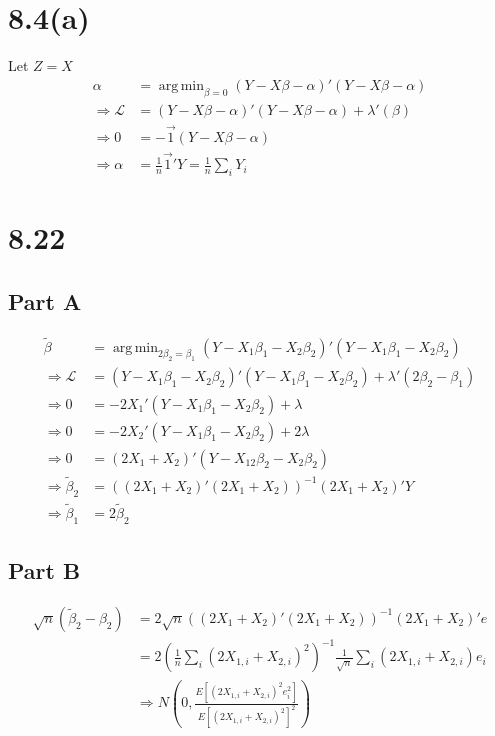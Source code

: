 \documentclass[11pt]{article} %
\DeclareMathOperator*{\argmin}{arg\,min}
\begin{document}
\section{8.4(a)}
Let $Z = X$
\begin{align*}
\alpha &= \argmin_{\beta = 0} (Y-X\beta - \alpha)'(Y-X\beta - \alpha)\\
\Rightarrow \mathcal{L} &=  (Y-X\beta - \alpha)'(Y-X\beta - \alpha) + \lambda'(\beta)\\
\Rightarrow 0&=-\vec{1}(Y-X\beta - \alpha) \\
\Rightarrow \alpha &= \frac{1}{n}\vec{1}'Y = \frac{1}{n}\sum_iY_i
\end{align*}
\section{8.22}
\subsection{Part A}
\begin{align*}
\tilde{\beta} &= \argmin_{2\beta_2 = \beta_1}  (Y-X_1\beta_1 -X_2\beta_2)'(Y-X_1\beta_1 -X_2\beta_2)\\
\Rightarrow \mathcal{L} &= (Y-X_1\beta_1 -X_2\beta_2)'(Y-X_1\beta_1 -X_2\beta_2) + \lambda'(2\beta_2 - \beta_1)\\
\Rightarrow 0&= -2X_1'(Y-X_1\beta_1 - X_2 \beta_2)+\lambda\\
\Rightarrow 0&= -2X_2'(Y-X_1\beta_1 - X_2 \beta_2)+2\lambda\\
\Rightarrow 0&= (2X_1 + X_2)'(Y-X_12\beta_2 - X_2 \beta_2)\\
\Rightarrow \tilde{\beta}_2&= ((2X_1 +X_2)'(2X_1 +X_2))^{-1}(2X_1 +X_2)'Y\\
\Rightarrow \tilde{\beta}_1&= 2\tilde{\beta}_2
\end{align*}
\subsection{Part B}
\begin{align*}
\sqrt{n}(\tilde{\beta}_2 - \beta_2) &= 2\sqrt{n}((2X_1 +X_2)'(2X_1 +X_2))^{-1}(2X_1 +X_2)'e\\
&=2 (\frac{1}{n}\sum_i (2X_{1,i} +X_{2,i})^{2})^{-1} \frac{1}{\sqrt{n}}\sum_i (2X_{1,i} +X_{2,i})e_i\\
&\Rightarrow N\left(0,\frac{E[ (2X_{1,i} +X_{2,i})^2e_i^2]}{E[(2X_{1,i} +X_{2,i})^{2}]^2} \right)
\end{align*}
\end{document}
